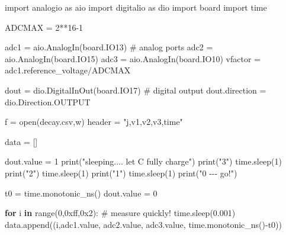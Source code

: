 \documentclass[
  letterpaper,
  DIV=11,
  numbers=noendperiod]{scrartcl}
\newenvironment{Shaded}{\begin{snugshade}}{\end{snugshade}}
\newcommand{\BaseNTok}[1]{\textcolor[rgb]{0.68,0.00,0.00}{#1}}
\newcommand{\BuiltInTok}[1]{\textcolor[rgb]{0.00,0.23,0.31}{#1}}
\newcommand{\CommentTok}[1]{\textcolor[rgb]{0.37,0.37,0.37}{#1}}
\newcommand{\ControlFlowTok}[1]{\textcolor[rgb]{0.00,0.23,0.31}{\textbf{#1}}}
\newcommand{\DecValTok}[1]{\textcolor[rgb]{0.68,0.00,0.00}{#1}}
\newcommand{\FloatTok}[1]{\textcolor[rgb]{0.68,0.00,0.00}{#1}}
\newcommand{\ImportTok}[1]{\textcolor[rgb]{0.00,0.46,0.62}{#1}}
\newcommand{\KeywordTok}[1]{\textcolor[rgb]{0.00,0.23,0.31}{\textbf{#1}}}
\newcommand{\NormalTok}[1]{\textcolor[rgb]{0.00,0.23,0.31}{#1}}
\newcommand{\OperatorTok}[1]{\textcolor[rgb]{0.37,0.37,0.37}{#1}}
\newcommand{\StringTok}[1]{\textcolor[rgb]{0.13,0.47,0.30}{#1}}
\begin{document}
\begin{Shaded}
\begin{Highlighting}[]
\ImportTok{import}\NormalTok{ analogio }\ImportTok{as}\NormalTok{ aio}
\ImportTok{import}\NormalTok{ digitalio }\ImportTok{as}\NormalTok{ dio}
\ImportTok{import}\NormalTok{ board}
\ImportTok{import}\NormalTok{ time}

\NormalTok{ADCMAX }\OperatorTok{=} \DecValTok{2}\OperatorTok{**}\DecValTok{16}\OperatorTok{{-}}\DecValTok{1}

\NormalTok{adc1 }\OperatorTok{=}\NormalTok{ aio.AnalogIn(board.IO13) }\CommentTok{\# analog ports}
\NormalTok{adc2 }\OperatorTok{=}\NormalTok{ aio.AnalogIn(board.IO15)}
\NormalTok{adc3 }\OperatorTok{=}\NormalTok{ aio.AnalogIn(board.IO10)}
\NormalTok{vfactor }\OperatorTok{=}\NormalTok{ adc1.reference\_voltage}\OperatorTok{/}\NormalTok{ADCMAX}

\NormalTok{dout }\OperatorTok{=}\NormalTok{ dio.DigitalInOut(board.IO17) }\CommentTok{\# digital output}
\NormalTok{dout.direction }\OperatorTok{=}\NormalTok{ dio.Direction.OUTPUT}

\NormalTok{f }\OperatorTok{=} \BuiltInTok{open}\NormalTok{(}\StringTok{\textquotesingle{}decay.csv\textquotesingle{}}\NormalTok{,}\StringTok{\textquotesingle{}w\textquotesingle{}}\NormalTok{)}
\NormalTok{header }\OperatorTok{=} \StringTok{"j,v1,v2,v3,time"}

\NormalTok{data }\OperatorTok{=}\NormalTok{ []}

\NormalTok{dout.value }\OperatorTok{=} \DecValTok{1}
\BuiltInTok{print}\NormalTok{(}\StringTok{"sleeping.... let C fully charge"}\NormalTok{)}
\BuiltInTok{print}\NormalTok{(}\StringTok{"3"}\NormalTok{)}
\NormalTok{time.sleep(}\DecValTok{1}\NormalTok{)}
\BuiltInTok{print}\NormalTok{(}\StringTok{"2"}\NormalTok{)}
\NormalTok{time.sleep(}\DecValTok{1}\NormalTok{)}
\BuiltInTok{print}\NormalTok{(}\StringTok{"1"}\NormalTok{)}
\NormalTok{time.sleep(}\DecValTok{1}\NormalTok{)}
\BuiltInTok{print}\NormalTok{(}\StringTok{"0 {-}{-}{-} go!"}\NormalTok{)}

\NormalTok{t0 }\OperatorTok{=}\NormalTok{ time.monotonic\_ns()}
\NormalTok{dout.value }\OperatorTok{=} \DecValTok{0}

\ControlFlowTok{for}\NormalTok{ i }\KeywordTok{in} \BuiltInTok{range}\NormalTok{(}\DecValTok{0}\NormalTok{,}\BaseNTok{0xff}\NormalTok{,}\BaseNTok{0x2}\NormalTok{): }\CommentTok{\# measure quickly!}
\NormalTok{    time.sleep(}\FloatTok{0.001}\NormalTok{)}
\NormalTok{    data.append((i,adc1.value, adc2.value, adc3.value, time.monotonic\_ns()}\OperatorTok{{-}}\NormalTok{t0))}


\end{Highlighting}
\end{Shaded}
\end{document}
